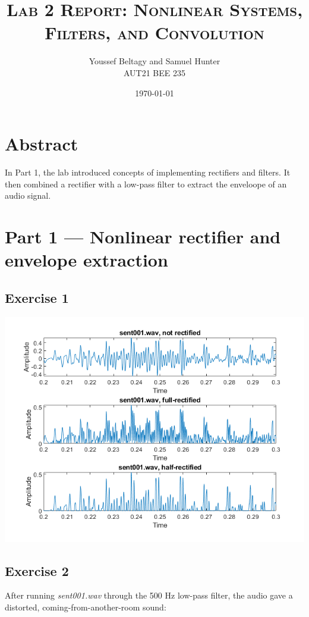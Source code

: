 \documentclass[11pt]{article}
\title{
    \textsc{Lab 2 Report: Nonlinear Systems, Filters, and Convolution}
}
\author{
    \Large{Youssef Beltagy and Samuel Hunter} \\
    \large \textsc{AUT21 BEE 235}
}
\date{\today}
\begin{document}
\maketitle %
\pagebreak


\section{Abstract}

In Part 1, the lab introduced concepts of implementing rectifiers and filters.
It then combined a rectifier with a low-pass filter to extract the enveloope of an audio signal.

\section{Part 1 --- Nonlinear rectifier and envelope extraction}

\subsection{Exercise 1}



\includegraphics[width=\textwidth]{exercise1.png}

\subsection{Exercise 2}

After running \textit{sent001.wav} through the 500 Hz low-pass filter, the audio gave a distorted, coming-from-another-room sound:
\end{document}
